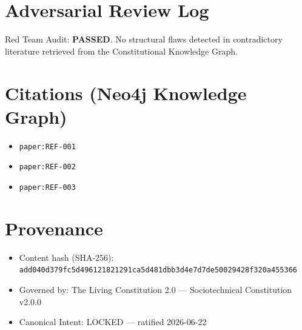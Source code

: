 \documentclass[12pt, twocolumn]{article}
\begin{document}
\section{Adversarial Review Log}
Red Team Audit: \textbf{PASSED}. No structural flaws detected in contradictory
literature retrieved from the Constitutional Knowledge Graph.

\section{Citations (Neo4j Knowledge Graph)}
\begin{itemize}
  \item \texttt{paper:REF-001}
  \item \texttt{paper:REF-002}
  \item \texttt{paper:REF-003}
\end{itemize}

\section{Provenance}
\begin{itemize}
  \item Content hash (SHA-256): \texttt{add040d379fc5d496121821291ca5d481dbb3d4e7d7de50029428f320a455366}
  \item Governed by: The Living Constitution 2.0 --- Sociotechnical Constitution v2.0.0
  \item Canonical Intent: LOCKED --- ratified 2026-06-22
\end{itemize}
\end{document}
